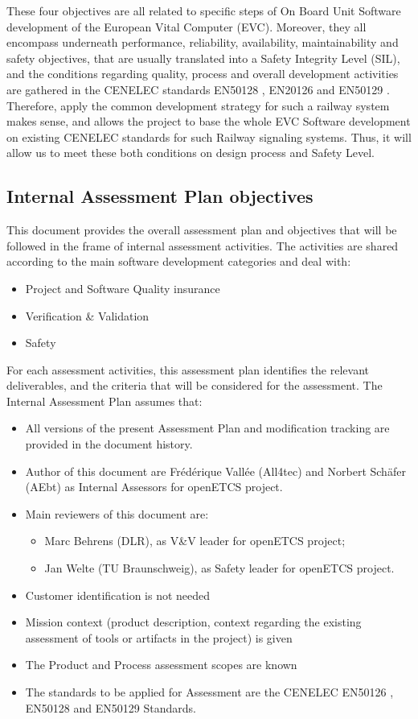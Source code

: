\documentclass{template/openetcs_article}
\begin{document}
These four objectives are all related to specific steps of On Board Unit Software development of the European Vital Computer (EVC). Moreover, they all encompass
underneath performance, reliability, availability, maintainability and safety objectives, that are usually translated into a Safety Integrity Level (SIL), and
the conditions regarding quality, process and overall development activities are gathered in the CENELEC standards EN50128 \cite{EN50128}, EN20126
\cite{EN50216} and EN50129 \cite{EN50129}.
Therefore, apply the common development strategy for such a railway system makes sense, and allows the project to base the whole EVC Software development on
existing CENELEC standards for such Railway signaling systems. Thus, it will allow us to meet these both conditions on design process and Safety Level.

\subsection{Internal Assessment Plan objectives}
This document provides the overall assessment plan and objectives that will be followed in the frame of internal assessment activities.
The activities are shared according to the main software development categories and deal with:
\begin{itemize}
\item Project and Software Quality insurance
\item Verification \& Validation
\item Safety
\end{itemize}

For each assessment activities, this assessment plan identifies the relevant deliverables, and the criteria that will be considered for the assessment.
The Internal Assessment Plan assumes that: 
\begin{itemize}
\item All versions of the present Assessment Plan and modification tracking are provided in the document history.
\item Author of this document are Fr\'ed\'erique Vall\'ee (All4tec) and Norbert Sch\"afer (AEbt) as Internal Assessors for openETCS project.
\item Main reviewers of this document are:
	\begin{itemize}
	\item Marc Behrens (DLR), as V\&V leader for openETCS project;
	\item Jan Welte (TU Braunschweig), as Safety leader for openETCS project.
	\end{itemize}
\item Customer identification is not needed
\item Mission context (product description, context regarding the existing assessment of tools or artifacts in the project) is given
\item The Product and Process assessment scopes are known
\item The standards to be applied for Assessment are the CENELEC EN50126 \cite{EN50126} , EN50128 \cite{EN50128} and EN50129 \cite{EN50129} Standards.
\end{itemize}
\end{document}
